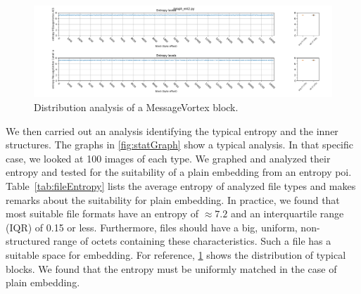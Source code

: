 \begin{figure}[ht]
	\includegraphics[width=\textwidth]{inc/statanalysis_mv}
	\caption{Distribution analysis of a MessageVortex block.}
	\label{fig:statMvGraph}
\end{figure}

We then carried out an analysis identifying the typical entropy and the inner structures. The graphs in \cref{fig:statGraph} show a typical analysis. In that specific case, we looked at 100 images of each type. We graphed and analyzed their entropy and tested for the suitability of a plain embedding from an entropy poi. Table~\ref{tab:fileEntropy} lists the average entropy of analyzed file types and makes remarks about the suitability for plain embedding. In practice, we found that most suitable file formats have an entropy of $\approx 7.2$ and an interquartile range (IQR) of 0.15 or less. Furthermore, files should have a big, uniform, non-structured range of octets containing these characteristics. Such a file has a suitable space for embedding. For reference, \cref{fig:statMvGraph} shows the distribution of typical \MessageVortex{} blocks. We found that the entropy must be uniformly matched in the case of plain embedding.

